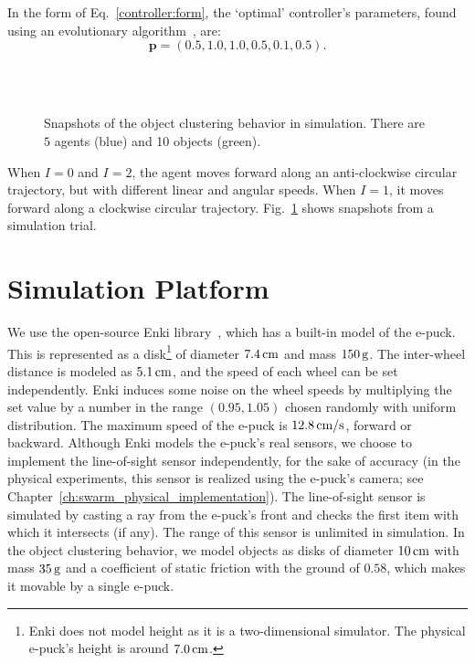 In the form of Eq.~\eqref{controller:form}, the `optimal' controller's parameters, found using an evolutionary algorithm~\cite{Melvin2014_aamas}, are:
\begin{equation}\label{eq:clustering_optimal_controller}
\mathbf{p} = \left( 0.5, 1.0, 1.0, 0.5, 0.1, 0.5 \right).
\end{equation} 

\captionsetup[subfigure]{labelformat=empty}  
\begin{figure}[!t]
	\centering
	\\
	\\
	\caption{Snapshots of the object clustering behavior in simulation. There are $5$ agents (blue) and 10 objects (green).}
	\label{fig:clustering_snapshoot}
\end{figure}

When $I=0$ and $I=2$, the agent moves forward along an anti-clockwise circular trajectory, but with different linear and angular speeds. When $I=1$, it moves forward along a clockwise circular trajectory. Fig.~\ref{fig:clustering_snapshoot} shows snapshots from a simulation trial.

\section{Simulation Platform}\label{sec:simulation_platform}

We use the open-source Enki library~\cite{Enki}, which has a built-in model of the e-puck. This is represented as a disk\footnote{Enki does not model height as it is a two-dimensional simulator. The physical e-puck's height is around $\unit[7.0]{cm}$.} of diameter $\unit[7.4]{cm}$ and mass $\unit[150]{g}$. The inter-wheel distance is modeled as $\unit[5.1]{cm}$, and the speed of each wheel can be set independently. Enki induces some noise on the wheel speeds by multiplying the set value by a number in the range $(0.95, 1.05)$ chosen randomly with uniform distribution. The maximum speed of the e-puck is $\unit[12.8]{\textrm{cm/s}}$, forward or backward. Although Enki models the e-puck's real sensors, we choose to implement the line-of-sight sensor independently, for the sake of accuracy (in the physical experiments, this sensor is realized using the e-puck's camera; see Chapter~\ref{ch:swarm_physical_implementation}). The line-of-sight sensor is simulated by casting a ray from the e-puck's front and checks the first item with which it intersects (if any). The range of this sensor is unlimited in simulation. In the object clustering behavior, we model objects as disks of diameter $\unit[10]{cm}$ with mass $\unit[35]{g}$ and a coefficient of static friction with the ground of $0.58$, which makes it movable by a single e-puck.

